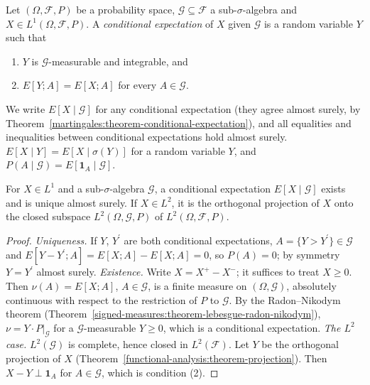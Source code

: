 \begin{definition}\label{martingales:definition-conditional-expectation}
Let $(\Omega, \mathcal{F}, P)$ be a probability space, $\mathcal{G} \subseteq \mathcal{F}$ a sub-$\sigma$-algebra and $X \in L^1(\Omega, \mathcal{F}, P)$. A \emph{conditional expectation} of $X$ given $\mathcal{G}$ is a random variable $Y$
such that
\begin{enumerate}
\item $Y$ is $\mathcal{G}$-measurable and integrable, and
\item $E[Y; A] = E[X; A]$ for every $A \in \mathcal{G}$.
\end{enumerate}
\end{definition}

\begin{notation}\label{martingales:notation-conditional-expectation}
We write $E[X \mid \mathcal{G}]$ for any conditional expectation (they agree almost surely, by Theorem~\ref{martingales:theorem-conditional-expectation}), and all equalities and inequalities between conditional expectations
hold almost surely. $E[X \mid Y] = E[X \mid \sigma(Y)]$ for a random variable $Y$, and $P(A \mid \mathcal{G}) = E[\mathbf{1}_A \mid \mathcal{G}]$.
\end{notation}

\begin{theorem}\label{martingales:theorem-conditional-expectation}
For $X \in L^1$ and a sub-$\sigma$-algebra $\mathcal{G}$, a conditional expectation $E[X \mid \mathcal{G}]$ exists and is unique almost surely. If $X \in L^2$, it is the orthogonal projection of $X$ onto the closed subspace
$L^2(\Omega, \mathcal{G}, P)$ of $L^2(\Omega, \mathcal{F}, P)$.
\end{theorem}

\begin{proof}
\emph{Uniqueness.} If $Y$, $Y^{\prime}$ are both conditional expectations, $A = \{Y > Y^{\prime}\} \in \mathcal{G}$ and $E[Y - Y^{\prime}; A] = E[X; A] - E[X; A] = 0$, so $P(A) = 0$; by symmetry $Y = Y^{\prime}$ almost surely.
\emph{Existence.} Write $X = X^+ - X^-$; it suffices to treat $X \geq 0$. Then $\nu(A) = E[X; A]$, $A \in \mathcal{G}$, is a finite measure on $(\Omega, \mathcal{G})$, absolutely continuous with respect to the restriction of $P$
to $\mathcal{G}$. By the Radon--Nikodym theorem (Theorem~\ref{signed-measures:theorem-lebesgue-radon-nikodym}), $\nu = Y\cdot P|_{\mathcal{G}}$ for a $\mathcal{G}$-measurable $Y \geq 0$, which is a conditional expectation.
\emph{The $L^2$ case.} $L^2(\mathcal{G})$ is complete, hence closed in $L^2(\mathcal{F})$. Let $Y$ be the orthogonal projection of $X$ (Theorem~\ref{functional-analysis:theorem-projection}). Then $X - Y \perp \mathbf{1}_A$ for
$A \in \mathcal{G}$, which is condition (2).
\end{proof}


